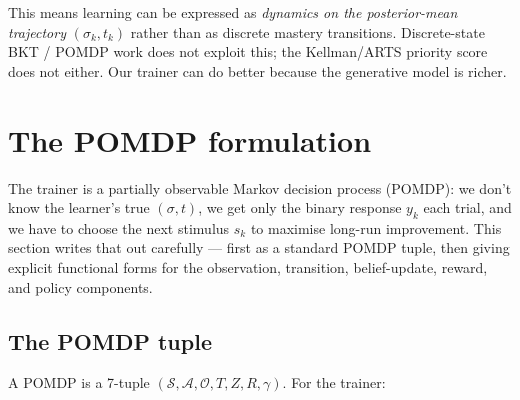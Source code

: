 \documentclass[11pt]{article}
\begin{document}
This means learning can be expressed as \emph{dynamics on the
posterior-mean trajectory} $(\sigma_k, t_k)$ rather than as discrete
mastery transitions. Discrete-state BKT / POMDP work does not exploit
this; the Kellman/ARTS priority score does not either. Our trainer can
do better because the generative model is richer.

\section{The POMDP formulation}
\label{sec:framework}

The trainer is a partially observable Markov decision process
(POMDP): we don't know the learner's true $(\sigma, t)$, we get only
the binary response $y_k$ each trial, and we have to choose the next
stimulus $s_k$ to maximise long-run improvement. This section writes
that out carefully — first as a standard POMDP tuple, then giving
explicit functional forms for the observation, transition,
belief-update, reward, and policy components.

\subsection{The POMDP tuple}
\label{sec:pomdp-tuple}

A POMDP is a 7-tuple $(\mathcal{S}, \mathcal{A}, \mathcal{O},
T, Z, R, \gamma)$. For the trainer:
\end{document}
